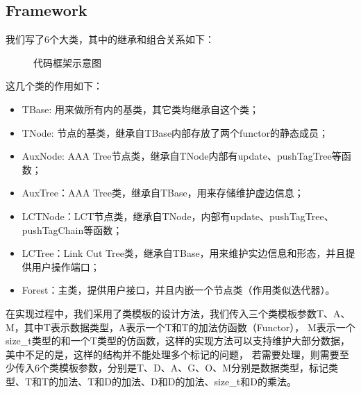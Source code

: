 ﻿\documentclass{article}
\begin{document}
		\subsection{Framework}
			我们写了6个大类，其中的继承和组合关系如下：\par
			\begin{figure}[!htbp]
				\centering
				\caption{代码框架示意图}
			\end{figure}
			这几个类的作用如下：
			\begin{itemize}
				\item TBase: 用来做所有内的基类，其它类均继承自这个类；
				\item TNode: 节点的基类，继承自TBase内部存放了两个functor的静态成员；
				\item AuxNode: AAA Tree节点类，继承自TNode内部有update、pushTagTree等函数；
				\item AuxTree：AAA Tree类，继承自TBase，用来存储维护虚边信息；
				\item LCTNode：LCT节点类，继承自TNode，内部有update、pushTagTree、pushTagChain等函数；
				\item LCTree：Link Cut Tree类，继承自TBase，用来维护实边信息和形态，并且提供用户操作端口；
				\item Forest：主类，提供用户接口，并且内嵌一个节点类（作用类似迭代器）。
			\end{itemize}
			\indent 在实现过程中，我们采用了类模板的设计方法，我们传入三个类模板参数T、A、M，其中T表示数据类型，A表示一个T和T的加法仿函数（Functor），
			M表示一个size\_t类型的和一个T类型的仿函数，这样的实现方法可以支持维护大部分数据，美中不足的是，这样的结构并不能处理多个标记的问题，
			若需要处理，则需要至少传入6个类模板参数，分别是T、D、A、G、O、M分别是数据类型，标记类型、T和T的加法、T和D的加法、D和D的加法、size\_t和D的乘法。
	\newpage
	
	
\end{document}
